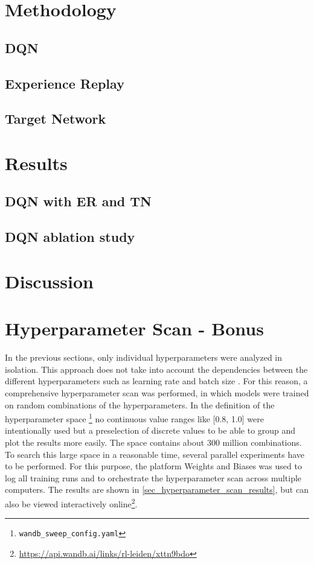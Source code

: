 \documentclass{article}
\begin{document}
\section{Methodology}
\label{sec_Methodology}

\subsection{DQN}

\subsection{Experience Replay}

\subsection{Target Network}



\section{Results}
\label{sec_results}

\subsection{DQN with ER and TN}

\subsection{DQN ablation study}


\section{Discussion}


\section{Hyperparameter Scan - Bonus}
In the previous sections, only individual hyperparameters were analyzed in isolation. 
This approach does not take into account the dependencies between the different hyperparameters 
such as learning rate and batch size \cite{DBLP:conf/iclr/SmithKYL18}. 
For this reason, a comprehensive hyperparameter scan was performed, in which models were trained on random combinations of the hyperparameters. 
In the definition of the hyperparameter space \footnote{\texttt{wandb\_sweep\_config.yaml}} 
no continuous value ranges like [0.8, 1.0] were intentionally used but a preselection of discrete values to be able to group and plot the results more easily. 
The space contains about 300 million combinations. 
To search this large space in a reasonable time, several parallel experiments have to be performed. 
For this purpose, the platform Weights and Biases \cite{wandb} was used to log all training runs and to orchestrate the hyperparameter scan across multiple computers. 
The results are shown in \autoref{sec_hyperparameter_scan_results}, 
but can also be viewed interactively online\footnote{\url{https://api.wandb.ai/links/rl-leiden/xttn9bdo}}. 
\end{document}
